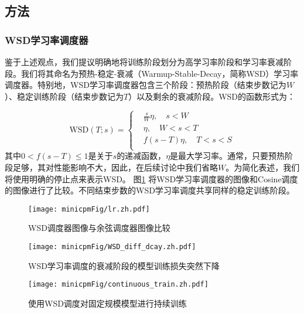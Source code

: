 \subsection{方法}
\subsubsection{WSD学习率调度器}
鉴于上述观点，我们提议明确地将训练阶段划分为高学习率阶段和学习率衰减阶段。我们将其命名为预热-稳定-衰减（Warmup-Stable-Decay，简称WSD）学习率调度器。特别地，WSD学习率调度器包含三个阶段：预热阶段（结束步数记为$W$）、稳定训练阶段（结束步数记为$T$）以及剩余的衰减阶段。WSD的函数形式为：

\begin{equation}
    \text{WSD}(T; s) = \begin{cases}
       & \frac{s}{W} \eta, \quad s<W\\
       & \eta, \quad W < s < T \\
       & f(s-T)\eta,\quad T < s < S\\
    \end{cases}
\end{equation}
其中$0 < f(s - T) \leq 1$是关于$s$的递减函数，$\eta$是最大学习率。通常，只要预热阶段足够，其对性能影响不大，因此，在后续讨论中我们省略$W$。为简化表述，我们将使用明确的停止点来表示WSD。 图\ref{fig:learning_rate_scheduler_diagram} 将WSD学习率调度器的图像和Cosine调度的图像进行了比较。不同结束步数的WSD学习率调度共享同样的稳定训练阶段。

\begin{figure}[!htbp]
    \centering
        \texttt{[image: minicpmFig/lr.zh.pdf]}
        \caption{WSD调度器图像与余弦调度器图像比较}\label{fig:learning_rate_scheduler_diagram}
\end{figure}

\begin{figure}[htbp]
    \centering
    \texttt{[image: minicpmFig/WSD\_diff\_dcay.zh.pdf]}
    \caption{WSD学习率调度的衰减阶段的模型训练损失突然下降}
    \label{fig:wsd_diff_dcay}
\end{figure}

\begin{figure}[htbp]
    \centering
    \texttt{[image: minicpmFig/continuous\_train.zh.pdf]}
    \caption{使用WSD调度对固定规模模型进行持续训练}
    \label{fig:continuoustrain}
\end{figure}


